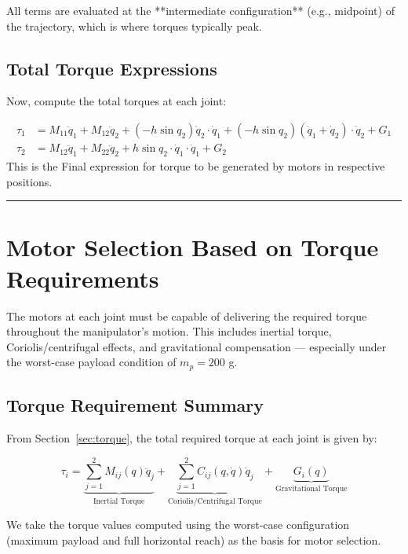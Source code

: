 \documentclass[a4paper,12pt]{article}
\begin{document}
\noindent All terms are evaluated at the **intermediate configuration** (e.g., midpoint) of the trajectory, which is where torques typically peak.


\subsection*{Total Torque Expressions}

Now, compute the total torques at each joint:

\begin{align*}
\tau_1 &= M_{11} \ddot{q}_1 + M_{12} \ddot{q}_2 
+ (-h \sin q_2) \dot{q}_2 \cdot \dot{q}_1 + (-h \sin q_2)(\dot{q}_1 + \dot{q}_2) \cdot \dot{q}_2 
+ G_1 \\
\tau_2 &= M_{12} \ddot{q}_1 + M_{22} \ddot{q}_2 
+ h \sin q_2 \cdot \dot{q}_1 \cdot \dot{q}_1 
+ G_2
\end{align*}
This is the Final expression for torque to be generated by motors in respective positions.

\vspace{1em}
\noindent\rule{\linewidth}{0.6pt}
\vspace{1em}


\section{Motor Selection Based on Torque Requirements} \label{sec:motors}

The motors at each joint must be capable of delivering the required torque throughout the manipulator's motion. This includes inertial torque, Coriolis/centrifugal effects, and gravitational compensation — especially under the worst-case payload condition of $m_p = 200$ g.

\subsection*{Torque Requirement Summary}

From Section~\ref{sec:torque}, the total required torque at each joint is given by:

\[
\tau_i = \underbrace{\sum_{j=1}^{2} M_{ij}(q) \ddot{q}_j}_{\text{Inertial Torque}} 
+ \underbrace{\sum_{j=1}^{2} C_{ij}(q, \dot{q}) \dot{q}_j}_{\text{Coriolis/Centrifugal Torque}} 
+ \underbrace{G_i(q)}_{\text{Gravitational Torque}}
\]

We take the torque values computed using the worst-case configuration (maximum payload and full horizontal reach) as the basis for motor selection.
\end{document}
